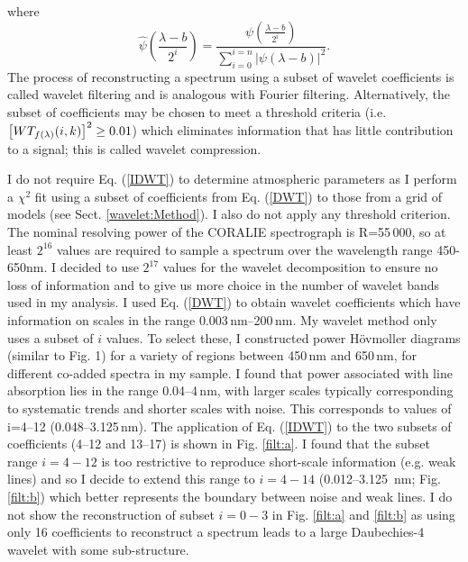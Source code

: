 %
where
%
\begin{equation}
\hat{\psi} \left(\frac{\lambda - b}{2^i} \right) = \frac{\psi \left(\frac{\lambda - b}{2^i} \right)}{\sum_{i=0}^{i=n} \left| \psi \left(\lambda - b \right) \right|^2 }
.\end{equation}
%
The process of reconstructing a spectrum using a subset of wavelet coefficients is called wavelet filtering and is analogous with Fourier filtering. Alternatively, the subset of coefficients may be chosen to meet a threshold criteria (i.e. $\left[ WT_{f(\lambda)}(i,k) \right]^2  \geq \rm 0.01$) which eliminates information that has little contribution to a signal; this is called wavelet compression.

I do not require Eq. (\ref{IDWT}) to determine atmospheric parameters as I perform a $\chi^2$ fit using a subset of coefficients from Eq. (\ref{DWT}) to those from a grid of models (see Sect. \ref{wavelet:Method}). I also do not apply any threshold criterion. The nominal resolving power of the CORALIE spectrograph is R=55\,000, so at least $2^{16}$ values are required to sample a spectrum over the wavelength range 450-650nm.  I decided to use $2^{17}$ values for the wavelet decomposition to ensure no loss of information and to give us more choice in the number of wavelet bands used in my analysis. I used Eq. (\ref{DWT}) to obtain wavelet coefficients which have information on scales in the range 0.003\,nm--200\,nm. My wavelet method only uses a subset of $i$ values. To select these, I constructed power H\"{o}vmoller diagrams (similar to Fig. 1) for a variety of regions between 450\,nm and 650\,nm, for different co-added spectra in my sample. I found that power associated with line absorption lies in the range 0.04--4\,nm, with larger scales typically corresponding to systematic trends and shorter scales with noise. This corresponds to values of i=4--12 (0.048--3.125\,nm).  The application of Eq. (\ref{IDWT}) to the two subsets of coefficients (4--12 and 13--17) is shown in Fig. \ref{filt:a}.  I found that the subset range $i=4-12$ is too restrictive  to reproduce short-scale information (e.g. weak lines) and so I decide to extend this range to $i=4-14$ (0.012--3.125\, nm; Fig. \ref{filt:b}) which better represents the boundary between noise and weak lines. I do not show the reconstruction of subset $i=0-3$ in Fig. \ref{filt:a} and \ref{filt:b} as using only 16 coefficients to reconstruct a spectrum leads to a large Daubechies-4 wavelet with some sub-structure.  


